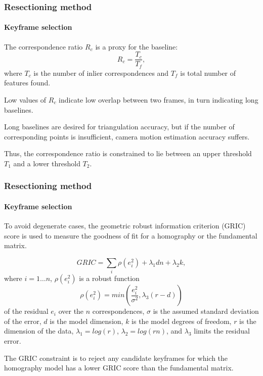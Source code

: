 \documentclass[aspectratio=169]{beamer}
\begin{document}
\begin{frame}
\frametitle{Resectioning method}
\framesubtitle{Keyframe selection}

The \alert{correspondence ratio} $R_{c}$ is a proxy for the baseline:
$$R_{c} = \frac{T_{c}}{T_{f}},$$
where $T_{c}$ is the number of inlier correspondences and $T_{f}$ is
total number of features found.

\medskip

Low values of $R_{c}$ indicate low overlap between two frames,
in turn indicating long baselines.

\medskip

Long baselines are desired for triangulation accuracy, but if the
number of corresponding points is insufficient, camera motion
estimation accuracy suffers.

\medskip

Thus, the correspondence ratio is constrained to lie between an upper
threshold $T_{1}$ and a lower threshold $T_{2}$.

\end{frame}


\begin{frame}
\frametitle{Resectioning method}
\framesubtitle{Keyframe selection}

To avoid degenerate cases, the \alert{geometric robust information criterion
(GRIC)} score is used to measure the goodness of fit for a homography
or the fundamental matrix.

$$GRIC = \sum_i \rho(e_{i}^{2}) + \lambda_{1}dn + \lambda_{2}k,$$
where $i = 1\ldots n$, $\rho(e_{i}^{2}) $ is a robust function
$$\rho(e_{i}^{2}) = min(\frac{e_{i}^{2}}{\sigma^2}, \lambda_{3}(r-d))$$
of the residual $e_i$ over the $n$ correspondences, $\sigma$ is the
assumed standard deviation of the error, $d$ is the model dimension, $k$ is
the model degrees of freedom, $r$ is the dimension of the data,
$\lambda_1 = log(r)$, $\lambda_2 = log(rn)$, and $\lambda_3$ limits
the residual error.

\medskip

The GRIC constraint is to \alert{reject} any candidate keyframes for
which the \alert{homography} model has a \alert{lower GRIC score} than
the \alert{fundamental matrix}.

\end{frame}
\end{document}
